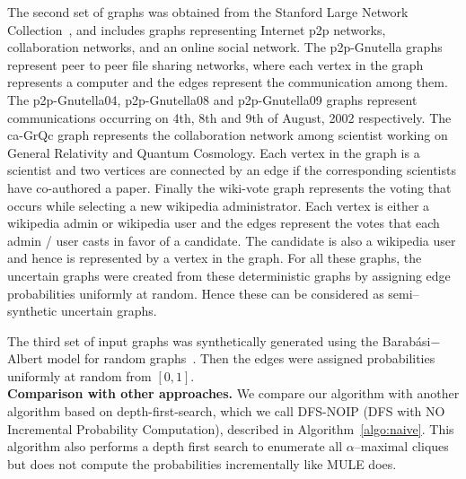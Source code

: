\documentclass[11pt,letterpaper]{article}
\begin{document}
The second set of graphs was obtained from the Stanford Large Network 
Collection~\cite{SNAP}, and includes graphs representing Internet p2p networks, 
collaboration networks, and an online social network.
The p2p-Gnutella graphs represent peer to peer file sharing networks, 
where each vertex in the graph represents a computer and the edges 
represent the communication among them. The p2p-Gnutella04,
p2p-Gnutella08 and p2p-Gnutella09 graphs represent communications
occurring on 4th, 8th and 9th of August, 2002 respectively.
The ca-GrQc graph represents the collaboration network among scientist 
working on General Relativity and Quantum Cosmology. Each vertex in the
graph is a scientist and two vertices are connected by an edge if the 
corresponding scientists have co-authored a paper.
Finally the wiki-vote graph represents the voting that occurs while
selecting a new wikipedia administrator. Each vertex is either a wikipedia
admin or wikipedia user and the edges represent the votes that each 
admin / user casts in favor of a candidate. The candidate is also a
wikipedia user and hence is represented by a vertex in the graph.
For all these graphs, the uncertain graphs were created from these 
deterministic graphs by assigning edge probabilities uniformly at random.  
Hence these can be considered as semi--synthetic uncertain graphs.

The third set of input graphs was
synthetically generated using the Barab{\'a}si$-$Albert model for
random graphs~\cite{RB2002}. Then the edges were assigned
probabilities uniformly at random from $[0,1]$. \\

{\bf Comparison with other approaches.}
We compare our algorithm with another algorithm based on depth-first-search, which we call DFS-NOIP (DFS with NO Incremental Probability Computation), described in Algorithm~\ref{algo:naive}. 
This algorithm also performs a depth first search to enumerate all $\alpha$--maximal cliques but does not compute the probabilities incrementally like MULE does. 

\end{document}
